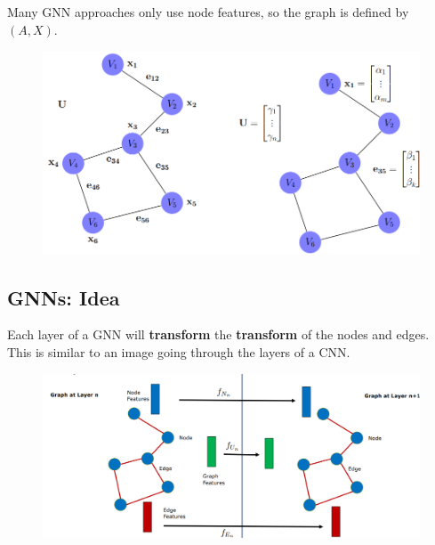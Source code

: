 Many GNN approaches only use node features, so the graph is defined by \((A,X)\).
\begin{figure}[!h]
    \includegraphics[width = \columnwidth]{figures/GraphNeuralNetworks2/Features.png}
\end{figure}

\subsection{GNNs: Idea}
Each layer of a GNN will \textbf{transform} the \textbf{transform} of the nodes and edges.
This is similar to an image going through the layers of a CNN.
\begin{figure}[!h]
    \includegraphics[width = \columnwidth]{figures/GraphNeuralNetworks2/GNNsIdea.png}
\end{figure}
